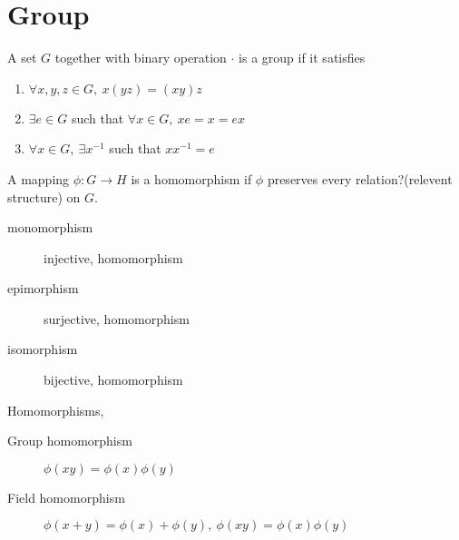 \section{Group}
	\begin{definition}
		A set $G$ together with binary operation $\cdot$ is a group if it satisfies
		\begin{enumerate}
			\item $\forall x,y,z \in G,\ x(yz) = (xy)z$
			\item $\exists e \in G$ such that $\forall x \in G,\ xe = x = ex$
			\item $\forall x \in G,\ \exists x^{-1}$ such that $xx^{-1} = e$
		\end{enumerate}
	\end{definition}
	\begin{definition}
		A mapping $\phi : G \to H$ is a homomorphism if $\phi$ preserves every relation?(relevent structure) on $G$.
		\begin{description}
			\item[monomorphism] injective, homomorphism
			\item[epimorphism] surjective, homomorphism
			\item[isomorphism] bijective, homomorphism
		\end{description}
	\end{definition}
	\begin{definition} Homomorphisms,
		\begin{description}
			\item[Group homomorphism] $\phi (xy) = \phi(x) \phi(y)$
			\item[Field homomorphism] $\phi (x+y) = \phi(x) + \phi(y),\ \phi(xy) = \phi(x)\phi(y)$
		\end{description}
	\end{definition}

